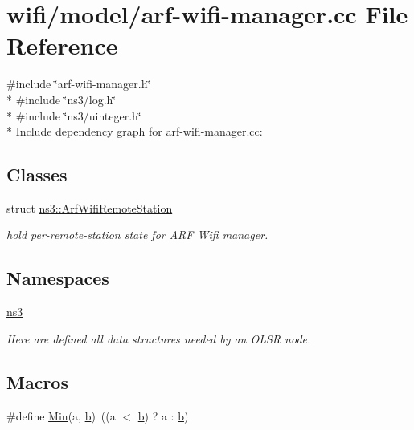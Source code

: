 \hypertarget{arf-wifi-manager_8cc}{}\section{wifi/model/arf-\/wifi-\/manager.cc File Reference}
\label{arf-wifi-manager_8cc}
{\ttfamily \#include \char`\"{}arf-\/wifi-\/manager.\+h\char`\"{}}\\*
{\ttfamily \#include \char`\"{}ns3/log.\+h\char`\"{}}\\*
{\ttfamily \#include \char`\"{}ns3/uinteger.\+h\char`\"{}}\\*
Include dependency graph for arf-\/wifi-\/manager.cc\+:
\subsection*{Classes}
\begin{DoxyCompactItemize}
\item 
struct \hyperlink{structns3_1_1ArfWifiRemoteStation}{ns3\+::\+Arf\+Wifi\+Remote\+Station}
\begin{DoxyCompactList}\small\item\em hold per-\/remote-\/station state for A\+RF Wifi manager. \end{DoxyCompactList}\end{DoxyCompactItemize}
\subsection*{Namespaces}
\begin{DoxyCompactItemize}
\item 
 \hyperlink{namespacens3}{ns3}
\begin{DoxyCompactList}\small\item\em Here are defined all data structures needed by an O\+L\+SR node. \end{DoxyCompactList}\end{DoxyCompactItemize}
\subsection*{Macros}
\begin{DoxyCompactItemize}
\item 
\#define \hyperlink{arf-wifi-manager_8cc_a9e04209162ea72f9985338596262b657}{Min}(a,  \hyperlink{lte__pathloss_8m_a21ad0bd836b90d08f4cf640b4c298e7c}{b})~((a $<$ \hyperlink{lte__pathloss_8m_a21ad0bd836b90d08f4cf640b4c298e7c}{b}) ? a \+: \hyperlink{lte__pathloss_8m_a21ad0bd836b90d08f4cf640b4c298e7c}{b})
\end{DoxyCompactItemize}
